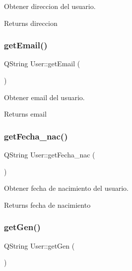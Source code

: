Obtener direccion del usuario. 

\begin{DoxyReturn}{Returns}
direccion 
\end{DoxyReturn}
\mbox{\label{classUser_ad6ef2b0be0450bdc6ac2c01ed7c8d9ca}} 
\subsubsection{\texorpdfstring{get\+Email()}{getEmail()}}
{\footnotesize\ttfamily Q\+String User\+::get\+Email (\begin{DoxyParamCaption}{ }\end{DoxyParamCaption})}



Obtener email del usuario. 

\begin{DoxyReturn}{Returns}
email 
\end{DoxyReturn}
\mbox{\label{classUser_a038bc7578cc67dc65dcc37cab56011cc}} 
\subsubsection{\texorpdfstring{get\+Fecha\+\_\+nac()}{getFecha\_nac()}}
{\footnotesize\ttfamily Q\+String User\+::get\+Fecha\+\_\+nac (\begin{DoxyParamCaption}{ }\end{DoxyParamCaption})}



Obtener fecha de nacimiento del usuario. 

\begin{DoxyReturn}{Returns}
fecha de nacimiento 
\end{DoxyReturn}
\mbox{\label{classUser_af6978ab530e6b4516575c569245e1cb1}} 
\subsubsection{\texorpdfstring{get\+Gen()}{getGen()}}
{\footnotesize\ttfamily Q\+String User\+::get\+Gen (\begin{DoxyParamCaption}{ }\end{DoxyParamCaption})}



